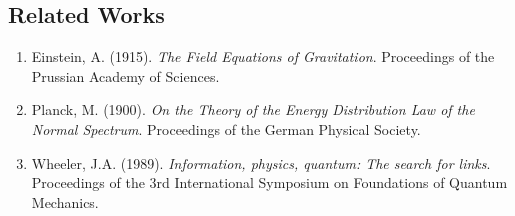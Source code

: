 	\subsection{Related Works}
	
	\begin{enumerate}
		\item Einstein, A. (1915). \textit{The Field Equations of Gravitation}. Proceedings of the Prussian Academy of Sciences.
		\item Planck, M. (1900). \textit{On the Theory of the Energy Distribution Law of the Normal Spectrum}. Proceedings of the German Physical Society.
		\item Wheeler, J.A. (1989). \textit{Information, physics, quantum: The search for links}. Proceedings of the 3rd International Symposium on Foundations of Quantum Mechanics.
	\end{enumerate}
	